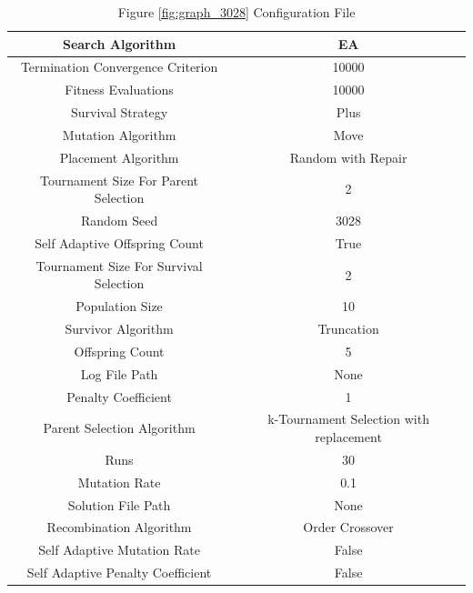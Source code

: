 \documentclass{standalone}
\begin{document}
\begin{table}[!htb]
	\centering
	\caption{Figure \ref{fig:graph_3028} Configuration File}
	\label{tab:graph_3028}
	\begin{tabular}{| c | c |}
		\hline
		Search Algorithm		& EA		 \\
		\hline
		Termination Convergence Criterion		& 10000		 \\
		\hline
		Fitness Evaluations		& 10000		 \\
		\hline
		Survival Strategy		& Plus		 \\
		\hline
		Mutation Algorithm		& Move		 \\
		\hline
		Placement Algorithm		& Random with Repair		 \\
		\hline
		Tournament Size For Parent Selection		& 2		 \\
		\hline
		Random Seed		& 3028		 \\
		\hline
		Self Adaptive Offspring Count		& True		 \\
		\hline
		Tournament Size For Survival Selection		& 2		 \\
		\hline
		Population Size		& 10		 \\
		\hline
		Survivor Algorithm		& Truncation		 \\
		\hline
		Offspring Count		& 5		 \\
		\hline
		Log File Path		& None		 \\
		\hline
		Penalty Coefficient		& 1		 \\
		\hline
		Parent Selection Algorithm		& k-Tournament Selection with replacement		 \\
		\hline
		Runs		& 30		 \\
		\hline
		Mutation Rate		& 0.1		 \\
		\hline
		Solution File Path		& None		 \\
		\hline
		Recombination Algorithm		& Order Crossover		 \\
		\hline
		Self Adaptive Mutation Rate		& False		 \\
		\hline
		Self Adaptive Penalty Coefficient		& False		 \\
		\hline
	\end{tabular}
\end{table}
\end{document}
